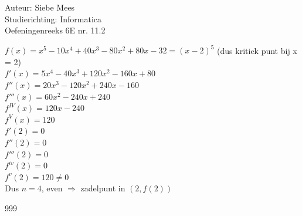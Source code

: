 \documentclass[a4paper]{article}
\begin{document}
  
\noindent \large Auteur: Siebe Mees \\
\noindent \large Studierichting: Informatica\\
\noindent \large Oefeningenreeks 6E nr. 11.2\\

\medskip

\normalsize

$f(x)=x^5-10x^4+40x^3-80x^2+80x-32 = (x-2)^5 $ (dus kritiek punt bij x = 2)\\

$f'(x)=5x^4-40x^3+120x^2-160x+80$\\

$f''(x)=20x^3-120x^2+240x-160$\\

$f'''(x)=60x^2-240x+240$\\

$f^{IV}(x)=120x-240$\\

$f^{V}(x)=120$\\

$f'(2)=0$\\

$f''(2)=0$\\

$f'''(2)=0$\\

$f^{iv}(2)=0$\\

$f^{v}(2)=120\neq 0$\\

Dus $n=4$, even $\Rightarrow$ zadelpunt in $(2, f(2))$\\

\begin{thebibliography}{999}
\end{thebibliography}
\end{document}
